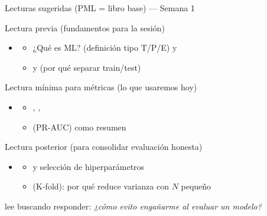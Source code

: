 \begin{frame}{Lecturas sugeridas (PML = libro base) — Semana 1}


\begin{block}{Lectura previa (fundamentos para la sesión)}
\begin{itemize}
  \item {}
  \begin{itemize}
    \item ¿Qué es ML? (definición tipo T/P/E) y 
    \item {} y  (por qué separar train/test)
  \end{itemize}
\end{itemize}
\end{block}

\begin{block}{Lectura mínima para métricas (lo que usaremos hoy)}
\begin{itemize}
  \item {}
  \begin{itemize}
    \item {}, , 
    \item {} (PR-AUC) como resumen
  \end{itemize}
\end{itemize}
\end{block}

\begin{block}{Lectura posterior (para consolidar evaluación honesta)}
\begin{itemize}
  \item {}
  \begin{itemize}
    \item {} y selección de hiperparámetros
    \item {} (K-fold): por qué reduce varianza con $N$ pequeño
  \end{itemize}
\end{itemize}
\end{block}

\small
{} lee buscando responder: \emph{¿cómo evito engañarme al evaluar un modelo?}
\end{frame}


